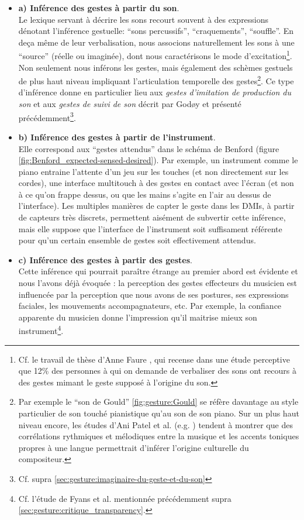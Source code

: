 \vspace{-1em}
\begin{itemize}[noitemsep]
	\item \textbf{a) Inférence des gestes à partir du son}.\\
	Le lexique servant à décrire les sons recourt souvent à des expressions dénotant l'inférence gestuelle: ``sons percussifs'', ``craquements'', ``souffle''. En deça même de leur verbalisation, nous associons naturellement les sons à une ``source'' (réelle ou imaginée), dont nous caractérisons le mode d'excitation\footnote{Cf. le travail de thèse d'Anne Faure \cite{faure_sons_2000}, qui recense dans une étude perceptive que 12\% des personnes à qui on demande de verbaliser des sons ont recours à des gestes mimant le geste supposé à l'origine du son.}. Non seulement nous inférons les gestes, mais également des schèmes gestuels de plus haut niveau impliquant l'articulation temporelle des gestes\footnote{Par exemple le ``son de Gould'' \ref{fig:gesture:Gould} se réfère davantage au style particulier de son touché pianistique qu'au son de son piano. Sur un plus haut niveau encore, les études d'Ani Patel et al. (e.g. \cite{patel_comparing_2006}) tendent à montrer que des corrélations rythmiques et mélodiques entre la musique et les accents toniques propres à une langue permettrait d'inférer l'origine culturelle du compositeur.}. Ce type d'inférence donne en particulier lieu aux \textit{gestes d'imitation de production du son} et aux \textit{gestes de suivi de son} décrit par Godøy et présenté précédemment\footnote{Cf. supra \ref{sec:gesture:imaginaire-du-geste-et-du-son}}.

	\item \textbf{b) Inférence des gestes à partir de l'instrument}.\\
	Elle correspond aux ``gestes attendus'' dans le schéma de Benford (figure \ref{fig:Benford_expected-sensed-desired}). Par exemple, un instrument comme le piano entraine l'attente d'un jeu sur les touches (et non directement sur les cordes), une interface multitouch à des gestes en contact avec l'écran (et non à ce qu'on frappe dessus, ou que les mains s'agite en l'air au dessus de l'interface). Les multiples manières de capter le geste dans les \glspl{DMI}, à partir de capteurs très discrets, permettent aisément de subvertir cette inférence, mais elle suppose que l'interface de l'instrument soit suffisament référente pour qu'un certain ensemble de gestes soit effectivement attendus.

	\item \textbf{c) Inférence des gestes à partir des gestes}.\\
	Cette inférence qui pourrait paraître étrange au premier abord est évidente et nous l'avons déjà évoquée : la perception des gestes effecteurs du musicien est influencée par la perception que nous avons de ses postures, ses expressions faciales, les mouvements accompagnateurs, etc. Par exemple, la confiance apparente du musicien donne l'impression qu'il maitrise mieux son instrument\footnote{Cf. l'étude de Fyans et al. mentionnée précédemment supra \ref{sec:gesture:critique_transparency}.}.


\end{itemize}
